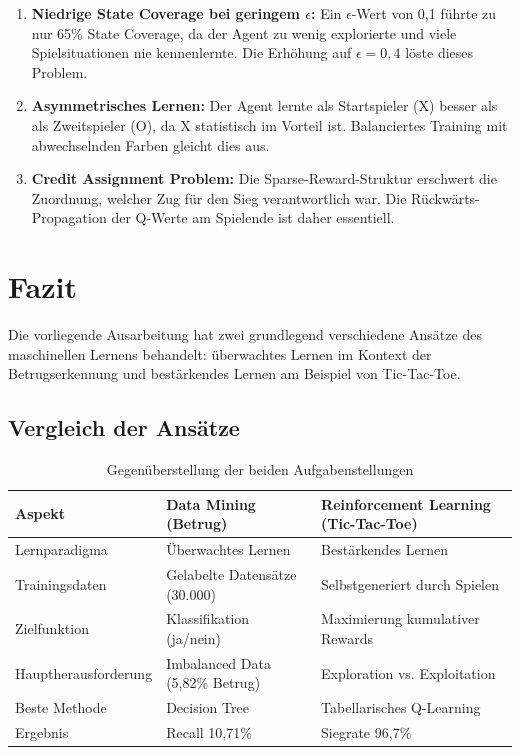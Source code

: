 \begin{enumerate}
    \item \textbf{Niedrige State Coverage bei geringem $\epsilon$:} Ein $\epsilon$-Wert von 0,1 führte zu nur 65\% State Coverage, da der Agent zu wenig explorierte und viele Spielsituationen nie kennenlernte. Die Erhöhung auf $\epsilon = 0,4$ löste dieses Problem.
    
    \item \textbf{Asymmetrisches Lernen:} Der Agent lernte als Startspieler (X) besser als als Zweitspieler (O), da X statistisch im Vorteil ist. Balanciertes Training mit abwechselnden Farben gleicht dies aus.
    
    \item \textbf{Credit Assignment Problem:} Die Sparse-Reward-Struktur erschwert die Zuordnung, welcher Zug für den Sieg verantwortlich war. Die Rückwärts-Propagation der Q-Werte am Spielende ist daher essentiell.
\end{enumerate}



\chapter{Fazit}

Die vorliegende Ausarbeitung hat zwei grundlegend verschiedene Ansätze des maschinellen Lernens behandelt: überwachtes Lernen im Kontext der Betrugserkennung und bestärkendes Lernen am Beispiel von Tic-Tac-Toe.

\section{Vergleich der Ansätze}

\begin{table}[H]
\centering
\begin{tabular}{l|p{5.5cm}|p{5.5cm}}
\textbf{Aspekt} & \textbf{Data Mining (Betrug)} & \textbf{Reinforcement Learning (Tic-Tac-Toe)} \\
\hline
Lernparadigma & Überwachtes Lernen & Bestärkendes Lernen \\
Trainingsdaten & Gelabelte Datensätze (30.000) & Selbstgeneriert durch Spielen \\
Zielfunktion & Klassifikation (ja/nein) & Maximierung kumulativer Rewards \\
Hauptherausforderung & Imbalanced Data (5,82\% Betrug) & Exploration vs. Exploitation \\
Beste Methode & Decision Tree & Tabellarisches Q-Learning \\
Ergebnis & Recall 10,71\% & Siegrate 96,7\% \\
\end{tabular}
\caption{Gegenüberstellung der beiden Aufgabenstellungen}
\end{table}

